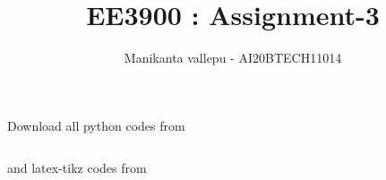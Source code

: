 \documentclass[journal,12pt,twocolumn]{IEEEtran}
\DeclareMathOperator*{\Res}{Res}
\begin{document}
\newcommand{\BEQA}{\begin{eqnarray}}
\newcommand{\EEQA}{\end{eqnarray}}
\newcommand{\define}{\stackrel{\triangle}{=}}

\raggedbottom
\setlength{\parindent}{0pt}
\providecommand{\mbf}{\mathbf}
\providecommand{\pr}[1]{\ensuremath{\Pr\left(#1\right)}}
\providecommand{\qfunc}[1]{\ensuremath{Q\left(#1\right)}}
\providecommand{\sbrak}[1]{\ensuremath{{}\left[#1\right]}}
\providecommand{\lsbrak}[1]{\ensuremath{{}\left[#1\right.}}
\providecommand{\rsbrak}[1]{\ensuremath{{}\left.#1\right]}}
\providecommand{\brak}[1]{\ensuremath{\left(#1\right)}}
\providecommand{\lbrak}[1]{\ensuremath{\left(#1\right.}}
\providecommand{\rbrak}[1]{\ensuremath{\left.#1\right)}}
\providecommand{\cbrak}[1]{\ensuremath{\left\{#1\right\}}}
\providecommand{\lcbrak}[1]{\ensuremath{\left\{#1\right.}}
\providecommand{\rcbrak}[1]{\ensuremath{\left.#1\right\}}}
\theoremstyle{remark}
\newtheorem{rem}{Remark}
\newcommand{\sgn}{\mathop{\mathrm{sgn}}}
\providecommand{\abs}[1]{\vert#1\vert}
\providecommand{\res}[1]{\Res\displaylimits_{#1}} 
\providecommand{\norm}[1]{\lVert#1\rVert}
\providecommand{\mtx}[1]{\mathbf{#1}}
\providecommand{\mean}[1]{E[ #1 ]}
\providecommand{\fourier}{\overset{\mathcal{F}}{ \rightleftharpoons}}
\providecommand{\system}{\overset{\mathcal{H}}{ \longleftrightarrow}}
\newcommand{\solution}{\noindent \textbf{Solution: }}
\newcommand{\cosec}{\,\text{cosec}\,}
\providecommand{\dec}[2]{\ensuremath{\overset{#1}{\underset{#2}{\gtrless}}}}
\newcommand{\myvec}[1]{\ensuremath{\begin{pmatrix}#1\end{pmatrix}}}
\newcommand{\mydet}[1]{\ensuremath{\begin{vmatrix}#1\end{vmatrix}}}
\makeatletter
{}
\makeatother
\let\StandardTheFigure\thefigure
\let\vec\mathbf
\renewcommand{\thefigure}{\theproblem}
\def\putbox#1#2#3{\makebox[0in][l]{\makebox[#1][l]{}\raisebox{\baselineskip}[0in][0in]{\raisebox{#2}[0in][0in]{#3}}}}
     \def\rightbox#1{\makebox[0in][r]{#1}}
     \def\centbox#1{\makebox[0in]{#1}}
     \def\topbox#1{\raisebox{-\baselineskip}[0in][0in]{#1}}
     \def\midbox#1{\raisebox{-0.5\baselineskip}[0in][0in]{#1}}
\vspace{3cm}
\title{ EE3900 : Assignment-3}
\author{Manikanta vallepu - AI20BTECH11014}
\maketitle
\newpage
\bigskip
\renewcommand{\thefigure}{\theenumi}
\renewcommand{\thetable}{\theenumi}
Download all python codes from 
\begin{lstlisting}

\end{lstlisting}
%
and latex-tikz codes from 
%
\begin{lstlisting}

\end{lstlisting}
\vspace{0.5cm}
\end{document}
